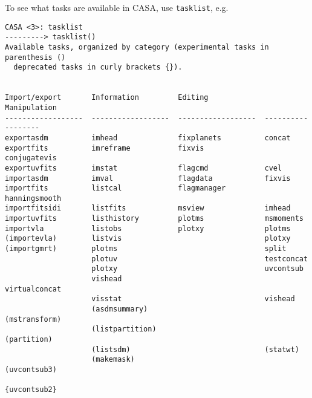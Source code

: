 To see what tasks are available in CASA, use {\tt tasklist}, e.g.
\small
\begin{verbatim}
CASA <3>: tasklist
---------> tasklist()
Available tasks, organized by category (experimental tasks in parenthesis ()
  deprecated tasks in curly brackets {}).


Import/export       Information         Editing             Manipulation      
------------------  ------------------  ------------------  ------------------
exportasdm          imhead              fixplanets          concat            
exportfits          imreframe           fixvis              conjugatevis      
exportuvfits        imstat              flagcmd             cvel              
importasdm          imval               flagdata            fixvis            
importfits          listcal             flagmanager         hanningsmooth     
importfitsidi       listfits            msview              imhead            
importuvfits        listhistory         plotms              msmoments         
importvla           listobs             plotxy              plotms            
(importevla)        listvis                                 plotxy            
(importgmrt)        plotms                                  split             
                    plotuv                                  testconcat        
                    plotxy                                  uvcontsub         
                    vishead                                 virtualconcat     
                    visstat                                 vishead           
                    (asdmsummary)                           (mstransform)     
                    (listpartition)                         (partition)       
                    (listsdm)                               (statwt)          
                    (makemask)                              (uvcontsub3)      
                                                            {uvcontsub2}      


\end{verbatim}
